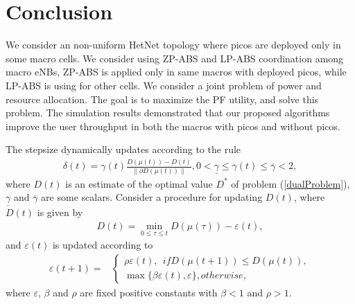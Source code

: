 \documentclass[journal]{IEEETran}
\begin{document}
\section{Conclusion}\label{conclusion}
We consider an non-uniform HetNet topology where picos are deployed only in some macro cells. We consider using ZP-ABS and LP-ABS coordination among macro eNBs, ZP-ABS is applied only in same macros with deployed picos, while LP-ABS is using for other cells. We consider a joint problem of power and resource allocation. The goal is to maximize the PF utility, and solve this problem. The simulation results demonstrated that our proposed algorithms improve the user throughput in both the macros with picos and without picos.

The stepsize dynamically updates according to the rule
\begin{align}
\delta(t) = \gamma(t)\frac{D(\mu(t))-D(t)}{\| \partial D(\mu(t)) \|}, 0 < \underline{\gamma} \leq \gamma(t) \leq \overline{\gamma} < 2,
\end{align}
where $D(t)$ is an estimate of the optimal value $D^*$ of problem (\ref{dualProblem}), $\underline{\gamma}$ and $\overline{\gamma}$ are some scalars\cite{ConvexOptimization}. Consider a procedure for updating $D(t)$, where $D(t)$ is given by
\begin{align}
D(t) = \min_{0 \leq \tau \leq t} D(\mu (\tau)) - \varepsilon(t),
\end{align}
and $\varepsilon(t)$ is updated according to 
\begin{align}
\varepsilon(t+1)= 
&\left\{
\begin{matrix}
\rho \varepsilon(t),~~if D(\mu(t+1)) \leq D(\mu(t)), \\
\max\{  \beta \varepsilon(t), \varepsilon \}, otherwise,
\end{matrix}
\right.
\end{align}
where $\varepsilon$, $\beta$ and $\rho$ are fixed positive constants with  $\beta<1$
 and $\rho>1$\cite{ConvexOptimization}.


\end{document}
